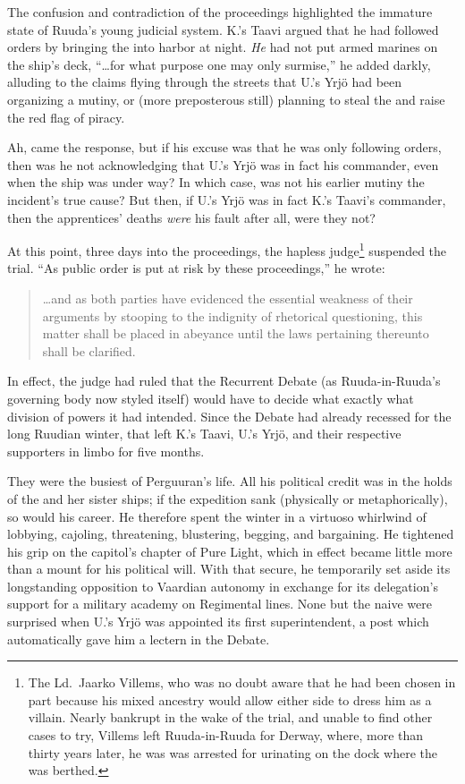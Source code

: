 \documentclass[12pt]{report}
\begin{document}
The confusion and contradiction of the proceedings highlighted the
immature state of Ruuda's young judicial system.  K.'s Taavi argued
that he had followed orders by bringing the 
into harbor at night.  \emph{He} had not put armed marines on the
ship's deck, ``{\ldots}for what purpose one may only surmise,'' he added
darkly, alluding to the claims flying through the streets that U.'s
Yrj\"{o} had been organizing a mutiny, or (more preposterous still)
planning to steal the  and raise the red flag of
piracy.

Ah, came the response, but if his excuse was that he was only
following orders, then was he not acknowledging that U.'s Yrj\"{o} was
in fact his commander, even when the ship was under way?  In which
case, was not his earlier mutiny the incident's true cause?  But then,
if U.'s Yrj\"{o} was in fact K.'s Taavi's commander, then the
apprentices' deaths \emph{were} his fault after all, were they not?

At this point, three days into the proceedings, the hapless
judge\footnote{The Ld.\ Jaarko Villems, who was no doubt aware that he
had been chosen in part because his mixed ancestry would allow either
side to dress him as a villain.  Nearly bankrupt in the wake of the
trial, and unable to find other cases to try, Villems left
Ruuda-in-Ruuda for Derway, where, more than thirty years later, he was
was arrested for urinating on the dock where the {\UL} was berthed.}
suspended the trial.  ``As public order is put at risk by these
proceedings,'' he wrote:

\begin{quotation}
{\ldots}and as both parties have evidenced the essential weakness of
their arguments by stooping to the indignity of rhetorical
questioning, this matter shall be placed in abeyance until the laws
pertaining thereunto shall be clarified.
\end{quotation}

In effect, the judge had ruled that the Recurrent Debate (as
Ruuda-in-Ruuda's governing body now styled itself) would have to
decide what exactly what division of powers it had intended.  Since
the Debate had already recessed for the long Ruudian winter, that left
K.'s Taavi, U.'s Yrj\"{o}, and their respective supporters in limbo
for five months.

They were the busiest of Perguuran's life.  All his political credit
was in the holds of the  and her sister ships;
if the expedition sank (physically or metaphorically), so would his
career.  He therefore spent the winter in a virtuoso whirlwind of
lobbying, cajoling, threatening, blustering, begging, and bargaining.
He tightened his grip on the capitol's chapter of Pure Light, which in
effect became little more than a mount for his political will.  With
that secure, he temporarily set aside its longstanding opposition to
Vaardian autonomy in exchange for its delegation's support for a
military academy on Regimental lines.  None but the naive were
surprised when U.'s Yrj\"{o} was appointed its first superintendent, a
post which automatically gave him a lectern in the Debate.
\end{document}
